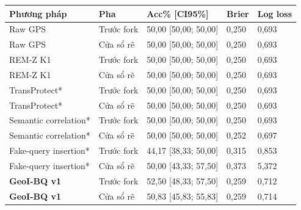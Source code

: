 \par\smallskip\noindent\begin{tabularx}{\linewidth}{@{}P{3cm}P{2.1cm}X P{1cm}P{1cm}@{}}\toprule
\textbf{Phương pháp} & \textbf{Pha} & \textbf{Acc\% [CI95\%]} & \textbf{Brier} & \textbf{Log loss} \\
\midrule
Raw GPS & Trước fork & 50{,}00 [50{,}00; 50{,}00] & 0{,}250 & 0{,}693 \\
Raw GPS & Cửa sổ rẽ & 50{,}00 [50{,}00; 50{,}00] & 0{,}250 & 0{,}693 \\
REM-Z K1 & Trước fork & 50{,}00 [50{,}00; 50{,}00] & 0{,}250 & 0{,}693 \\
REM-Z K1 & Cửa sổ rẽ & 50{,}00 [50{,}00; 50{,}00] & 0{,}250 & 0{,}693 \\
TransProtect* & Trước fork & 50{,}00 [50{,}00; 50{,}00] & 0{,}250 & 0{,}693 \\
TransProtect* & Cửa sổ rẽ & 50{,}00 [50{,}00; 50{,}00] & 0{,}250 & 0{,}693 \\
Semantic correlation* & Trước fork & 50{,}00 [50{,}00; 50{,}00] & 0{,}250 & 0{,}693 \\
Semantic correlation* & Cửa sổ rẽ & 50{,}00 [50{,}00; 50{,}00] & 0{,}252 & 0{,}697 \\
Fake-query insertion* & Trước fork & 44{,}17 [38{,}33; 50{,}00] & 0{,}315 & 0{,}853 \\
Fake-query insertion* & Cửa sổ rẽ & 50{,}00 [43{,}33; 57{,}50] & 0{,}373 & 5{,}372 \\
\textbf{GeoI-BQ v1} & Trước fork & 52{,}50 [48{,}33; 57{,}50] & 0{,}259 & 0{,}712 \\
\textbf{GeoI-BQ v1} & Cửa sổ rẽ & 50{,}83 [45{,}83; 55{,}83] & 0{,}259 & 0{,}714 \\
\bottomrule\end{tabularx}\par\smallskip
